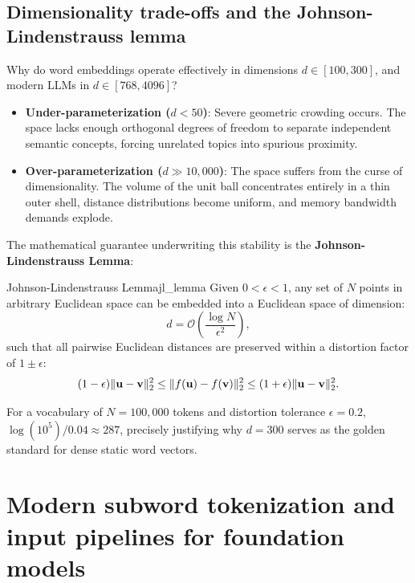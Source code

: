 \documentclass[../../main.tex]{subfiles}
\begin{document}
\subsection{Dimensionality trade-offs and the Johnson-Lindenstrauss lemma}
\label{subsec:johnson_lindenstrauss}

Why do word embeddings operate effectively in dimensions $d \in [100, 300]$, and modern LLMs in $d \in [768, 4096]$?
\begin{itemize}
    \item \textbf{Under-parameterization ($d < 50$)}: Severe geometric crowding occurs. The space lacks enough orthogonal degrees of freedom to separate independent semantic concepts, forcing unrelated topics into spurious proximity.
    \item \textbf{Over-parameterization ($d \gg 10{,}000$)}: The space suffers from the curse of dimensionality. The volume of the unit ball concentrates entirely in a thin outer shell, distance distributions become uniform, and memory bandwidth demands explode.
\end{itemize}

The mathematical guarantee underwriting this stability is the \textbf{Johnson-Lindenstrauss Lemma}:
\begin{theorem}{Johnson-Lindenstrauss Lemma}{jl_lemma}
Given $0 < \epsilon < 1$, any set of $N$ points in arbitrary Euclidean space can be embedded into a Euclidean space of dimension:
\begin{equation}
\label{eq:jl_dimension}
d = \mathcal{O}\left( \frac{\log N}{\epsilon^2} \right),
\end{equation}
such that all pairwise Euclidean distances are preserved within a distortion factor of $1 \pm \epsilon$:
\begin{equation}
\label{eq:jl_bound}
(1 - \epsilon) \|\mathbf{u} - \mathbf{v}\|_2^2 \le \|f(\mathbf{u}) - f(\mathbf{v})\|_2^2 \le (1 + \epsilon) \|\mathbf{u} - \mathbf{v}\|_2^2.
\end{equation}
\end{theorem}
For a vocabulary of $N = 100{,}000$ tokens and distortion tolerance $\epsilon = 0.2$, $\log(10^5) / 0.04 \approx 287$, precisely justifying why $d = 300$ serves as the golden standard for dense static word vectors.

\clearpage
\section{Modern subword tokenization and input pipelines for foundation models}
\label{sec:modern_tokenization_pipeline}
\end{document}

